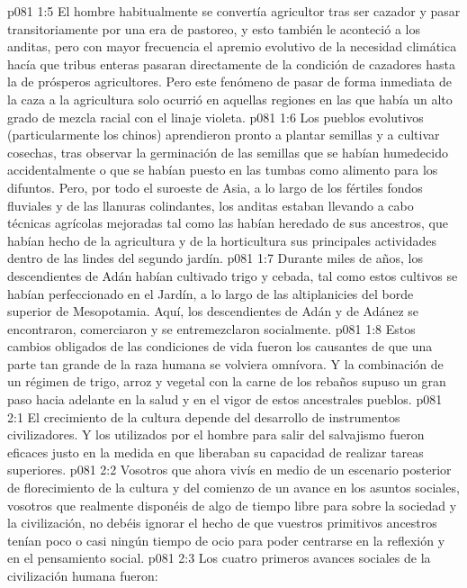 \vs p081 1:5 El hombre habitualmente se convertía agricultor tras ser cazador y pasar transitoriamente por una era de pastoreo, y esto también le aconteció a los anditas, pero con mayor frecuencia el apremio evolutivo de la necesidad climática hacía que tribus enteras pasaran directamente de la condición de cazadores hasta la de prósperos agricultores. Pero este fenómeno de pasar de forma inmediata de la caza a la agricultura solo ocurrió en aquellas regiones en las que había un alto grado de mezcla racial con el linaje violeta.
\vs p081 1:6 Los pueblos evolutivos (particularmente los chinos) aprendieron pronto a plantar semillas y a cultivar cosechas, tras observar la germinación de las semillas que se habían humedecido accidentalmente o que se habían puesto en las tumbas como alimento para los difuntos. Pero, por todo el suroeste de Asia, a lo largo de los fértiles fondos fluviales y de las llanuras colindantes, los anditas estaban llevando a cabo técnicas agrícolas mejoradas tal como las habían heredado de sus ancestros, que habían hecho de la agricultura y de la horticultura sus principales actividades dentro de las lindes del segundo jardín.
\vs p081 1:7 Durante miles de años, los descendientes de Adán habían cultivado trigo y cebada, tal como estos cultivos se habían perfeccionado en el Jardín, a lo largo de las altiplanicies del borde superior de Mesopotamia. Aquí, los descendientes de Adán y de Adánez se encontraron, comerciaron y se entremezclaron socialmente.
\vs p081 1:8 Estos cambios obligados de las condiciones de vida fueron los causantes de que una parte tan grande de la raza humana se volviera omnívora. Y la combinación de un régimen de trigo, arroz y vegetal con la carne de los rebaños supuso un gran paso hacia adelante en la salud y en el vigor de estos ancestrales pueblos.
\vs p081 2:1 El crecimiento de la cultura depende del desarrollo de instrumentos civilizadores. Y los utilizados por el hombre para salir del salvajismo fueron eficaces justo en la medida en que liberaban su capacidad de realizar tareas superiores.
\vs p081 2:2 Vosotros que ahora vivís en medio de un escenario posterior de florecimiento de la cultura y del comienzo de un avance en los asuntos sociales, vosotros que realmente disponéis de algo de tiempo libre para  sobre la sociedad y la civilización, no debéis ignorar el hecho de que vuestros primitivos ancestros tenían poco o casi ningún tiempo de ocio para poder centrarse en la reflexión y en el pensamiento social.
\vs p081 2:3 \pc Los cuatro primeros avances sociales de la civilización humana fueron:
